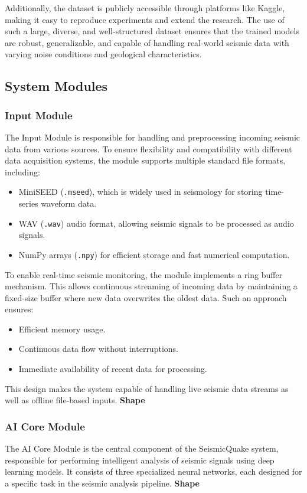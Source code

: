 \documentclass[a4paper,12pt]{report}
\begin{document}
Additionally, the dataset is publicly accessible through platforms like Kaggle, making it easy to reproduce experiments and extend the research. The use of such a large, diverse, and well-structured dataset ensures that the trained models are robust, generalizable, and capable of handling real-world seismic data with varying noise conditions and geological characteristics.

\subsection{System Modules}
\label{ssec:system_modules}

\subsubsection{Input Module}
The Input Module is responsible for handling and preprocessing incoming seismic data from various sources. To ensure flexibility and compatibility with different data acquisition systems, the module supports multiple standard file formats, including:
\begin{itemize}
\item MiniSEED (\texttt{.mseed}), which is widely used in seismology for storing time-series waveform data.
\item WAV (\texttt{.wav}) audio format, allowing seismic signals to be processed as audio signals.
\item NumPy arrays (\texttt{.npy}) for efficient storage and fast numerical computation.
\end{itemize}

To enable real-time seismic monitoring, the module implements a ring buffer mechanism. This allows continuous streaming of incoming data by maintaining a fixed-size buffer where new data overwrites the oldest data. Such an approach ensures:
\begin{itemize}
\item Efficient memory usage.
\item Continuous data flow without interruptions.
\item Immediate availability of recent data for processing.
\end{itemize}

This design makes the system capable of handling live seismic data streams as well as offline file-based inputs.
\textbf{Shape}

\subsubsection{AI Core Module}
The AI Core Module is the central component of the SeismicQuake system, responsible for performing intelligent analysis of seismic signals using deep learning models. It consists of three specialized neural networks, each designed for a specific task in the seismic analysis pipeline.
\textbf{Shape}
\end{document}
